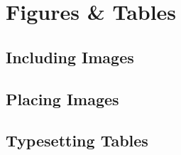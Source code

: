 \section{Figures \& Tables}

\subsection{Including Images}
\begin{frame}

\end{frame}

\subsection{Placing Images}
\begin{frame}

\end{frame}

\subsection{Typesetting Tables}
\begin{frame}

\end{frame}
